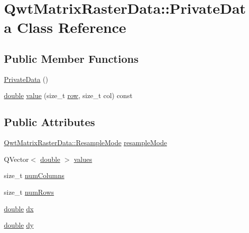 \hypertarget{class_qwt_matrix_raster_data_1_1_private_data}{\section{Qwt\-Matrix\-Raster\-Data\-:\-:Private\-Data Class Reference}
\label{class_qwt_matrix_raster_data_1_1_private_data}
}
\subsection*{Public Member Functions}
\begin{DoxyCompactItemize}
\item 
\hyperlink{class_qwt_matrix_raster_data_1_1_private_data_aeb317cd70317747989694473649dcc0e}{Private\-Data} ()
\item 
\hyperlink{_super_l_u_support_8h_a8956b2b9f49bf918deed98379d159ca7}{double} \hyperlink{class_qwt_matrix_raster_data_1_1_private_data_a823bf1e2e2b323e9462a9f2b045f6261}{value} (size\-\_\-t \hyperlink{glext_8h_a11b277b422822f784ee248b43eee3e1e}{row}, size\-\_\-t col) const 
\end{DoxyCompactItemize}
\subsection*{Public Attributes}
\begin{DoxyCompactItemize}
\item 
\hyperlink{class_qwt_matrix_raster_data_a3c8def5d9ae452bd82e6c4b71b480209}{Qwt\-Matrix\-Raster\-Data\-::\-Resample\-Mode} \hyperlink{class_qwt_matrix_raster_data_1_1_private_data_a9d7b97834e90e3f4187bc72c472e5a9d}{resample\-Mode}
\item 
Q\-Vector$<$ \hyperlink{_super_l_u_support_8h_a8956b2b9f49bf918deed98379d159ca7}{double} $>$ \hyperlink{class_qwt_matrix_raster_data_1_1_private_data_aa84d320fb4111314a182d4f485b27118}{values}
\item 
size\-\_\-t \hyperlink{class_qwt_matrix_raster_data_1_1_private_data_acee52903d07bad84e39907baf7c85131}{num\-Columns}
\item 
size\-\_\-t \hyperlink{class_qwt_matrix_raster_data_1_1_private_data_af7f6ad2916d2449a527c0f09b1e27c18}{num\-Rows}
\item 
\hyperlink{_super_l_u_support_8h_a8956b2b9f49bf918deed98379d159ca7}{double} \hyperlink{class_qwt_matrix_raster_data_1_1_private_data_a950781bd812f80ee559854865ab11dd3}{dx}
\item 
\hyperlink{_super_l_u_support_8h_a8956b2b9f49bf918deed98379d159ca7}{double} \hyperlink{class_qwt_matrix_raster_data_1_1_private_data_a2a3383c2af44ad624aa6619b0150d72e}{dy}
\end{DoxyCompactItemize}



